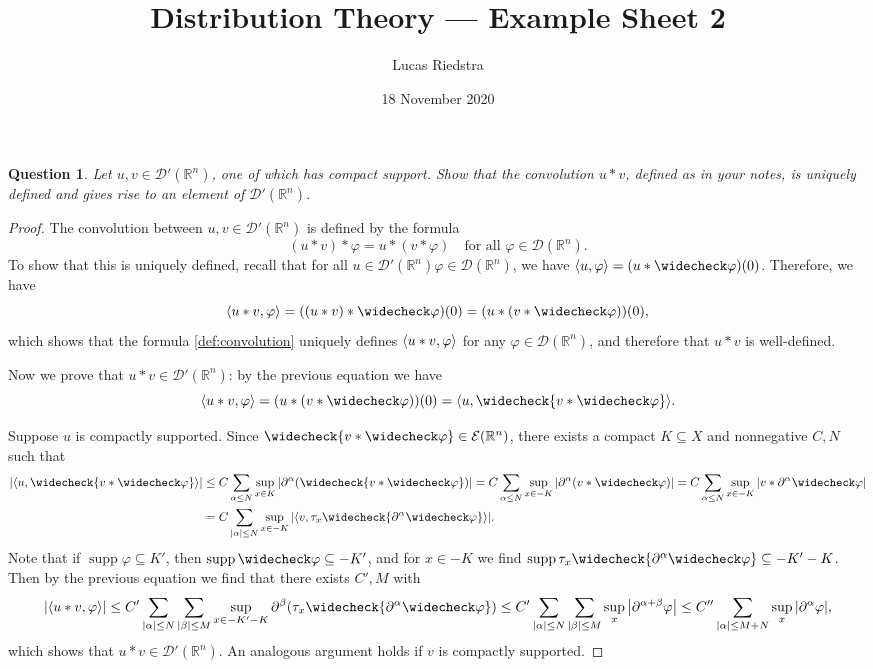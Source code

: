 \documentclass{article}
\title{Distribution Theory --- Example Sheet 2} %
\author{Lucas Riedstra}
\date{18 November 2020} %
\theoremstyle{plain}
\newtheorem{question}{Question}
\theoremstyle{remark}
\renewcommand{\phi}{\varphi}
\newcommand{\Bb}{\mathbb}
\newcommand{\Cal}{\mathcal}
\newcommand{\RR}{\Bb R}
\newcommand{\DD}{\Cal D}
\newcommand\EE{\Cal E}
\DeclarePairedDelimiter{\ang}{\langle}{\rangle}
\newcommand\pt\partial
\newcommand\refl\widecheck
\DeclareMathOperator{\supp}{supp}
\begin{document}
\maketitle
\begin{question}
Let $u, v \in \DD'(\RR^n)$, one of which has compact support. Show that the convolution $u * v$, defined as in your notes, is uniquely defined and gives rise to an element of $\DD'(\RR^n)$. 
\end{question}

\begin{proof}
	The convolution between $u, v \in \DD'(\RR^n)$ is defined by the formula
	\begin{equation} \label{def:convolution}
	(u * v) * \phi = u * (v * \phi) \quad\text{for all $\phi \in \DD(\RR^n)$}. 
	\end{equation}
	To show that this is uniquely defined, recall that for all $u \in \DD'(\RR^n) \phi\in \DD(\RR^n)$, we have $\ang{u, \phi} = (u * \refl\phi)(0)$. Therefore, we have
	\[
	\ang{u * v, \phi} = ((u * v) * \refl\phi)(0) = (u * (v * \refl\phi))(0),
	\]
	which shows that the formula \cref{def:convolution} uniquely defines $\ang{u * v, \phi}$ for any $\phi \in \DD(\RR^n)$, and therefore that $u * v$ is well-defined. 
	
	Now we prove that $u * v \in \DD'(\RR^n)$: by the previous equation we have
	\[
	\ang{u * v, \phi} = (u * (v * \refl\phi))(0) = \ang{u, \refl{v * \refl\phi}}.
	\]
	
	Suppose $u$ is compactly supported. Since $\refl{v * \refl\phi} \in \EE(\RR^n)$, there exists a compact $K \subseteq X$ and nonnegative $C, N$ such that
	\begin{align*}
		\abs{\ang{u, \refl{v * \refl\phi}}} &\leq C \sum_{\alpha \leq N} \sup_{x \in K} \abs{\pt^\alpha (\refl{v * \refl\phi})} = C \sum_{\alpha \leq N} \sup_{x \in -K} \abs{\pt^\alpha (v * \refl\phi)} = C \sum_{\alpha \leq N} \sup_{x \in -K} \abs{v * \pt^\alpha\refl\phi}\\
		&= C \sum_{\abs{\alpha} \leq N} \sup_{x \in -K} \abs{\ang{v, \tau_x \refl{\pt^\alpha \refl\phi}}}.
	\end{align*}
	Note that if $\supp\phi \subseteq K'$, then $\supp\refl\phi \subseteq -K'$, and for $x \in -K$ we find $\supp \tau_x \refl{\pt^\alpha \refl\phi} \subseteq -K' -K$. Then by the previous equation we find that there exists $C', M$ with
	\[
	\abs{\ang{u * v, \phi}} \leq C' \sum_{\abs{\alpha} \leq N} \sum_{\abs{\beta} \leq M} \sup_{x \in -K' - K} \pt^\beta (\tau_x \refl{\pt^\alpha \refl\phi}) \leq C' \sum_{\abs{\alpha} \leq N} \sum_{\abs{\beta} \leq M} \sup_x \abs{\pt^{\alpha + \beta} \phi} \leq C'' \sum_{\abs{\alpha} \leq M + N} \sup_x \abs{\pt^\alpha \phi},
	\]
	which shows that $u* v \in \DD'(\RR^n)$. An analogous argument holds if $v$ is compactly supported. 
\end{proof}
\end{document}
